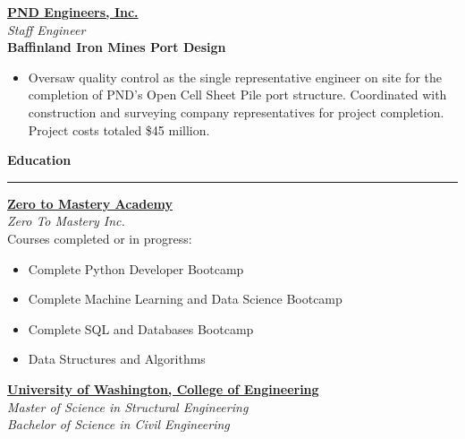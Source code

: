 \documentclass[letterpaper,6pt]{article}
\newcommand{\ts}{\textsuperscript}
\begin{document}
\vspace{3mm}
\href{https://www.pndengineers.com}{\textbf{PND Engineers, Inc.}} \\
\textit{Staff Engineer} \\
\textbf{\small{Baffinland Iron Mines Port Design}}
\begin{itemize}[itemsep=0.5mm,topsep=0pt]
    \item  Oversaw quality control as the single representative engineer on site for 
    the completion of PND's Open Cell Sheet Pile\ts{\textregistered} port structure. 
    Coordinated with construction and surveying company representatives for project
    completion. Project costs totaled \$45 million.
    \end{itemize}
    
\vspace{5mm}
{\large \textbf{Education}}
\vspace{0.5mm}
\hrule
\vspace{2mm}
\href{https://zerotomastery.io}{\textbf{Zero to Mastery Academy}} \\
\textit{Zero To Mastery Inc.} \\
Courses completed or in progress: 
\begin{itemize}[itemsep=0.5mm,topsep=0pt]
   \item Complete Python Developer Bootcamp
\end{itemize}
\begin{itemize}[itemsep=0.5mm,topsep=0pt]
   \item Complete Machine Learning and Data Science Bootcamp
\end{itemize}
\begin{itemize}[itemsep=0.5mm,topsep=0pt]
   \item Complete SQL and Databases Bootcamp
\end{itemize}
\begin{itemize}[itemsep=0.5mm,topsep=0pt]
   \item Data Structures and Algorithms
\end{itemize}

\vspace{3mm}
\href{https://www.ce.washington.edu}{\textbf{University of Washington, College of Engineering}} \\
\textit{Master of Science in Structural Engineering} \\
\textit{Bachelor of Science in Civil Engineering}
\end{document}
